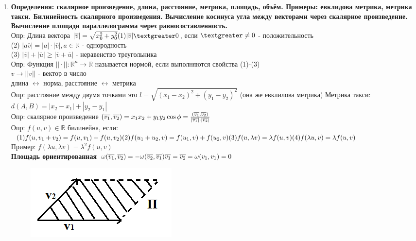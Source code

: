 \documentclass[12pt, oneside]{book}
\theoremstyle{definition}
\renewcommand{\geq}{\geqslant}
\begin{document}
\begin{enumerate}
\item \textbf{Определения: скалярное произведение, длина, расстояние, метрика, площадь, объём. Примеры: евклидова метрика, метрика такси. Билинейность скалярного произведения. Вычисление косинуса угла между векторами через скалярное произведение. Вычисление площади параллелограмма через равносоставленность.}\\
Опр: Длина вектора $|\overline{v}| = \sqrt{x_0^2 + y_0^2}\\
(1) |\overline{v}| \textgreater 0$, если $\textgreater \neq 0$ - положительность\\
(2) $|a \overline{v}| = |a|\cdot |\overline{v}|, a\in \mathbb{R}$ - однородность\\
(3) $|\overline{v}| + |\overline{u}| \geq |\overline{v} + \overline{u}|$ - неравенство треугольника\\
Опр: Функция $|| \cdot||: \mathbb{R}^n \longrightarrow \mathbb{R}$ называется нормой, если выполняются свойства (1)-(3)\\
$v \longrightarrow ||v||$ - вектор в число\\
длина $\longleftrightarrow$ норма, расстояние $\longleftrightarrow$ метрика\\
Опр: расстояние между двумя точками это $l = \sqrt{(x_1 - x_2)^2 + (y_1 - y_2)^2}$ (она же евклилова метрика)
Метрика такси:
$d(A,B) = |x_2 - x_1| + |y_2-y_1|$\\
Опр: скалярное произведение $(\overline{v_1}, \overline{v_2}) = x_1 x_2 + y_1 y_2\\
\cos{\phi} = \frac{(\overline{v_1}, \overline{v_2})}{|\overline{v_1}| \cdot |\overline{v_2}|}$\\
Опр: $f(u,v)\in \mathbb{R}$ билинейна, если:\\
$(1) f(u, v_1 + v_2) = f(u,v_1) + f(u,v_2)\\
(2)f(u_1 + u_2, v) = f(u_1,v) + f(u_2, v)\\
(3) f(u, \lambda v) = \lambda f(u,v)\\
(4)f(\lambda u, v) = \lambda f(u,v)$\\
Пример: $f(\lambda u, \lambda v) = {\lambda}^2 f(u,v)$\\
\textbf{Площадь ориентированная}
$\omega (\overline{v_1}, \overline{v_2}) = - \omega (\overline{v_2}, \overline{v_1})\\
\overline{v_1} = \overline{v_2} = \omega (v_1, v_1) = 0$\\
\begin{figure}[h!]
\centering
\includegraphics[scale=0.6]{3-1.PNG}

\end{figure}
\end{enumerate}
\end{document}
